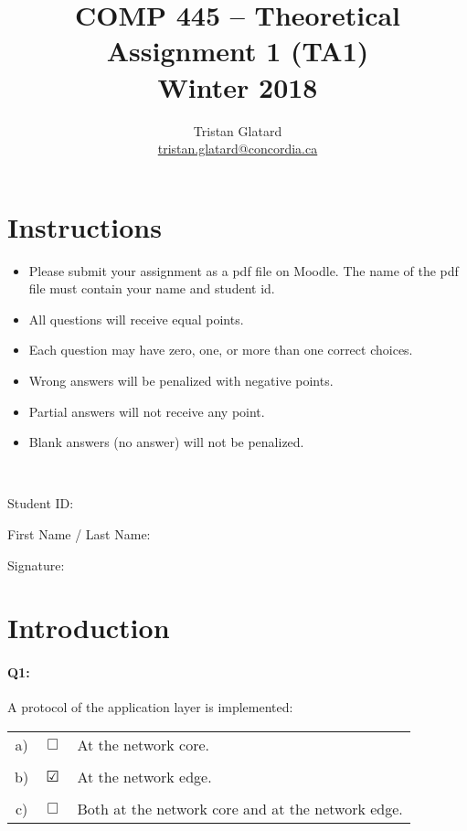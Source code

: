 \documentclass{llncs}
\title{COMP 445 -- Theoretical Assignment 1 (TA1)\\ Winter 2018}
\author{Tristan Glatard\\
  \href{mailto:tristan.glatard@concordia.ca}{tristan.glatard@concordia.ca}
}
\institute{Concordia University\\
  Department of Computer Science and Software Engineering}
\newcommand{\myspace}[0]{\vspace*{0.25cm}}
\begin{document}
\maketitle

\section*{Instructions}

\begin{itemize}
\item Please submit your assignment  as a pdf file on Moodle. The name of the pdf file must contain your name and student id. 
\item All questions will receive equal points.
\item Each question may have zero, one, or more than one
  correct choices.
\item Wrong answers will be penalized with negative
  points.
\item Partial answers will not
  receive any point.
\item Blank answers (no answer) will not be penalized.
\end{itemize}

\hrulefill\\

\myspace

\myspace

Student ID: \dotfill

\myspace

\myspace

First Name / Last Name: \dotfill

\myspace

\myspace

Signature: \dotfill

\myspace

\myspace

\hrulefill

\newpage

\section*{Introduction}

\paragraph{\textbf{Q1:}} A protocol of the application layer is implemented:\\

\begin{tabular}{ccl}
  a) & $\Box$ & At the network core. \\
  \\
  b) & $\CheckedBox$ & At the network edge. \\
  \\
  c) & $\Box$ & Both at the network core and at the network edge. 
\end{tabular}
\end{document}
